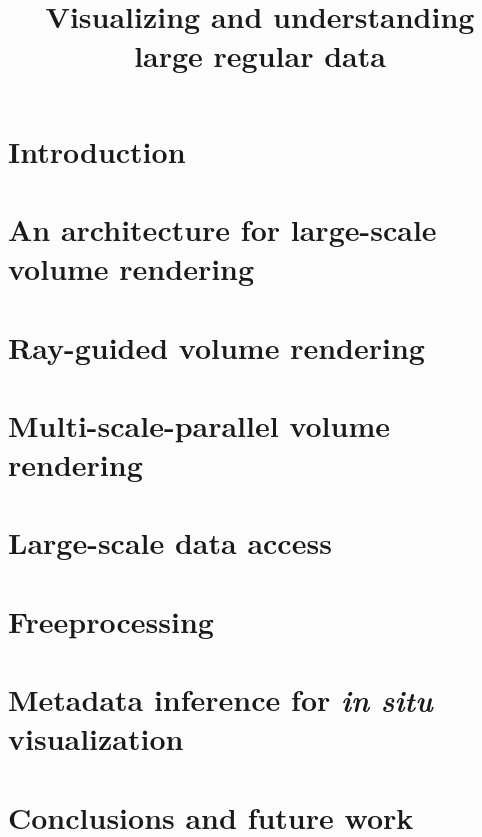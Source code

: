 \documentclass[12pt,twoside,headsepline,titlepage]{thesis}
\title{Visualizing and understanding large regular data}
\begin{document}

\newpage

\tableofcontents

\chapter{Introduction}


\chapter[An architecture for volume rendering]{An architecture for large-scale volume rendering}
\label{chp:tuvok}


\chapter{Ray-guided volume rendering}
\label{chp:rayguided}


\chapter{Multi-scale-parallel volume rendering}
\label{chp:multiscale}


\chapter{Large-scale data access}
\label{chp:io}


\chapter{Freeprocessing}
\label{chp:freeprocessing}


\chapter{Metadata inference for \textit{in situ} visualization}
\label{chp:inference}


\chapter{Conclusions and future work}
\label{chp:conclusions}




\end{document}
